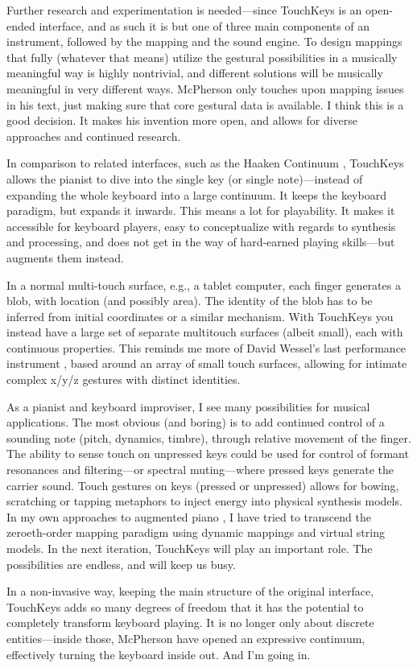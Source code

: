 Further research and experimentation is needed---since TouchKeys is an open-ended interface, and as such it is but one of three main components of an instrument, followed by the mapping and the sound engine. To design mappings that fully (whatever that means) utilize the gestural possibilities in a musically meaningful way is highly nontrivial, and different solutions will be musically meaningful in very different ways. McPherson only touches upon mapping issues in his text, just making sure that core gestural data is available. I think this is a good decision. It makes his invention more open, and allows for diverse approaches and continued research.

In comparison to related interfaces, such as the Haaken Continuum \cite{Haken:1998}, TouchKeys allows the pianist to dive into the single key (or single note)---instead of expanding the whole keyboard into a large continuum. It keeps the keyboard paradigm, but expands it inwards. This means a lot for playability. It makes it accessible for keyboard players, easy to conceptualize with regards to synthesis and processing, and does not get in the way of hard-earned playing skills---but augments them instead.

In a normal multi-touch surface, e.g., a tablet computer, each finger generates a blob, with location (and possibly area). The identity of the blob has to be inferred from initial coordinates or a similar mechanism. With TouchKeys you instead have a large set of separate multitouch surfaces (albeit small), each with continuous properties. This reminds me more of David Wessel's last performance instrument \cite{Wessel:2007}, based around an array of small touch surfaces, allowing for intimate complex x/y/z gestures with distinct identities.

As a pianist and keyboard improviser, I see many possibilities for musical applications. The most obvious (and boring) is to add continued control of a sounding note (pitch, dynamics, timbre), through relative movement of the finger. The ability to sense touch on unpressed keys could be used for control of formant resonances and filtering---or spectral muting---where pressed keys generate the carrier sound. Touch gestures on keys (pressed or unpressed) allows for bowing, scratching or tapping metaphors to inject energy into physical synthesis models. In my own approaches to augmented piano \cite{Dahlstedt:2015}, I have tried to transcend the zeroeth-order mapping paradigm using dynamic mappings and virtual string models. In the next iteration, TouchKeys will play an important role. The possibilities are endless, and will keep us busy.

In a non-invasive way, keeping the main structure of the original interface, TouchKeys adds so many degrees of freedom that it has the potential to completely transform keyboard playing. It is no longer only about discrete entities---inside those, McPherson have opened an expressive continuum, effectively turning the keyboard inside out. And I'm going in.

